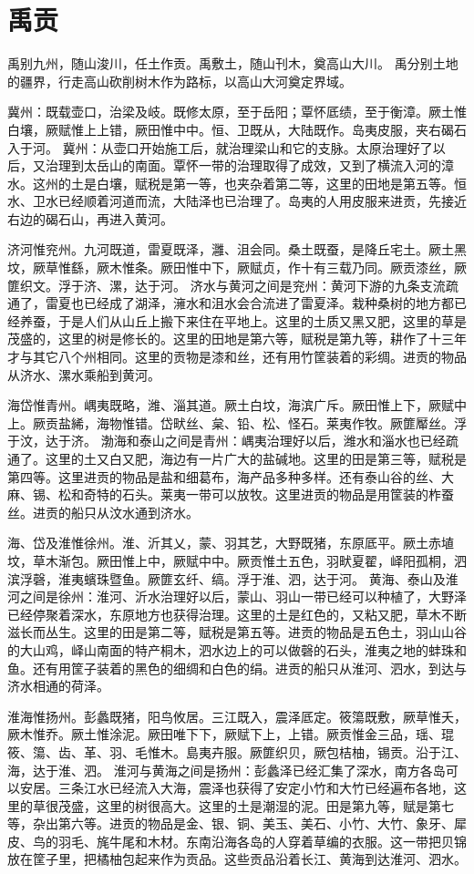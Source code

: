 \documentclass[12pt,UTF8]{ctexbook}
\begin{document}
\chapter{禹贡}

禹别九州，随山浚川，任土作贡。禹敷土，随山刊木，奠高山大川。
禹分别土地的疆界，行走高山砍削树木作为路标，以高山大河奠定界域。

冀州：既载壶口，治梁及岐。既修太原，至于岳阳；覃怀厎绩，至于衡漳。厥土惟白壤，厥赋惟上上错，厥田惟中中。恒、卫既从，大陆既作。岛夷皮服，夹右碣石入于河。
冀州：从壶口开始施工后，就治理梁山和它的支脉。太原治理好了以后，又治理到太岳山的南面。覃怀一带的治理取得了成效，又到了横流入河的漳水。这州的土是白壤，赋税是第一等，也夹杂着第二等，这里的田地是第五等。恒水、卫水已经顺着河道而流，大陆泽也已治理了。岛夷的人用皮服来进贡，先接近右边的碣石山，再进入黄河。

济河惟兖州。九河既道，雷夏既泽，灉、沮会同。桑土既蚕，是降丘宅土。厥土黑坟，厥草惟繇，厥木惟条。厥田惟中下，厥赋贞，作十有三载乃同。厥贡漆丝，厥篚织文。浮于济、漯，达于河。
济水与黄河之间是兖州：黄河下游的九条支流疏通了，雷夏也已经成了湖泽，澭水和沮水会合流进了雷夏泽。栽种桑树的地方都已经养蚕，于是人们从山丘上搬下来住在平地上。这里的土质又黑又肥，这里的草是茂盛的，这里的树是修长的。这里的田地是第六等，赋税是第九等，耕作了十三年才与其它八个州相同。这里的贡物是漆和丝，还有用竹筐装着的彩绸。进贡的物品从济水、漯水乘船到黄河。

海岱惟青州。嵎夷既略，潍、淄其道。厥土白坟，海滨广斥。厥田惟上下，厥赋中上。厥贡盐絺，海物惟错。岱畎丝、枲、铅、松、怪石。莱夷作牧。厥篚厴丝。浮于汶，达于济。
渤海和泰山之间是青州：嵎夷治理好以后，潍水和淄水也已经疏通了。这里的土又白又肥，海边有一片广大的盐碱地。这里的田是第三等，赋税是第四等。这里进贡的物品是盐和细葛布，海产品多种多样。还有泰山谷的丝、大麻、锡、松和奇特的石头。莱夷一带可以放牧。这里进贡的物品是用筐装的柞蚕丝。进贡的船只从汶水通到济水。

海、岱及淮惟徐州。淮、沂其乂，蒙、羽其艺，大野既猪，东原厎平。厥土赤埴坟，草木渐包。厥田惟上中，厥赋中中。厥贡惟土五色，羽畎夏翟，峄阳孤桐，泗滨浮磬，淮夷蠙珠暨鱼。厥篚玄纤、缟。浮于淮、泗，达于河。
黄海、泰山及淮河之间是徐州：淮河、沂水治理好以后，蒙山、羽山一带已经可以种植了，大野泽已经停聚着深水，东原地方也获得治理。这里的土是红色的，又粘又肥，草木不断滋长而丛生。这里的田是第二等，赋税是第五等。进贡的物品是五色土，羽山山谷的大山鸡，峄山南面的特产桐木，泗水边上的可以做磬的石头，淮夷之地的蚌珠和鱼。还有用筐子装着的黑色的细绸和白色的绢。进贡的船只从淮河、泗水，到达与济水相通的荷泽。

淮海惟扬州。彭蠡既猪，阳鸟攸居。三江既入，震泽厎定。筱簜既敷，厥草惟夭，厥木惟乔。厥土惟涂泥。厥田唯下下，厥赋下上，上错。厥贡惟金三品，瑶、琨筱、簜、齿、革、羽、毛惟木。島夷卉服。厥篚织贝，厥包桔柚，锡贡。沿于江、海，达于淮、泗。
淮河与黄海之间是扬州：彭蠡泽已经汇集了深水，南方各岛可以安居。三条江水已经流入大海，震泽也获得了安定小竹和大竹已经遍布各地，这里的草很茂盛，这里的树很高大。这里的土是潮湿的泥。田是第九等，赋是第七等，杂出第六等。进贡的物品是金、银、铜、美玉、美石、小竹、大竹、象牙、犀皮、鸟的羽毛、旄牛尾和木材。东南沿海各岛的人穿着草编的衣服。这一带把贝锦放在筐子里，把橘柚包起来作为贡品。这些贡品沿着长江、黄海到达淮河、泗水。
\end{document}
